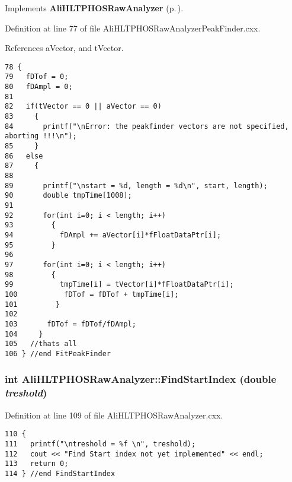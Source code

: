 Implements {\bf Ali\-HLTPHOSRaw\-Analyzer} {\rm (p.\,\pageref{classAliHLTPHOSRawAnalyzer_AliHLTPHOSRawAnalyzera14})}.

Definition at line 77 of file Ali\-HLTPHOSRaw\-Analyzer\-Peak\-Finder.cxx.

References a\-Vector, and t\-Vector.

\footnotesize\begin{verbatim}78 {
79   fDTof = 0;
80   fDAmpl = 0;
81 
82   if(tVector == 0 || aVector == 0)
83     {
84       printf("\nError: the peakfinder vectors are not specified, aborting !!!\n");
85     }
86   else
87     {
88 
89       printf("\nstart = %d, length = %d\n", start, length);   
90       double tmpTime[1008];
91       
92       for(int i=0; i < length; i++)
93         {  
94           fDAmpl += aVector[i]*fFloatDataPtr[i];    
95         }
96   
97       for(int i=0; i < length; i++)
98         {   
99           tmpTime[i] = tVector[i]*fFloatDataPtr[i];
100           fDTof = fDTof + tmpTime[i]; 
101         }
102 
103       fDTof = fDTof/fDAmpl;
104     }
105   //thats all 
106 } //end FitPeakFinder
\end{verbatim}\normalsize 


\subsubsection{\setlength{\rightskip}{0pt plus 5cm}int Ali\-HLTPHOSRaw\-Analyzer::Find\-Start\-Index (double {\em treshold})\hspace{0.3cm}{\tt  [inherited]}}\label{classAliHLTPHOSRawAnalyzer_AliHLTPHOSRawAnalyzerPeakFindera9}




Definition at line 109 of file Ali\-HLTPHOSRaw\-Analyzer.cxx.

\footnotesize\begin{verbatim}110 {
111   printf("\ntreshold = %f \n", treshold);
112   cout << "Find Start index not yet implemented" << endl;
113   return 0;
114 } //end FindStartIndex
\end{verbatim}\normalsize 


